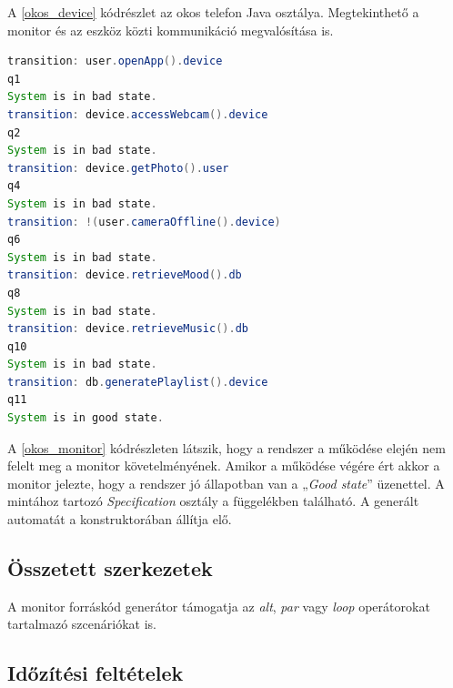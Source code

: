 A \ref{okos_device} kódrészlet az okos telefon Java osztálya.
Megtekinthető a monitor és az eszköz közti kommunikáció megvalósítása is.

\begin{lstlisting}[language=java, frame=single, float=ht!, caption={Monitor kimenete a rendszer működésének egyes fázisaiban.},captionpos=b,label=okos_monitor]
transition: user.openApp().device
q1
System is in bad state.
transition: device.accessWebcam().device
q2
System is in bad state.
transition: device.getPhoto().user
q4
System is in bad state.
transition: !(user.cameraOffline().device)
q6
System is in bad state.
transition: device.retrieveMood().db
q8
System is in bad state.
transition: device.retrieveMusic().db
q10
System is in bad state.
transition: db.generatePlaylist().device
q11
System is in good state.
\end{lstlisting}

A \ref{okos_monitor} kódrészleten látszik, hogy a rendszer a működése elején nem felelt meg a monitor követelményének.
Amikor a működése végére ért akkor a monitor jelezte, hogy a rendszer jó állapotban van a „\textit{Good state}” üzenettel.
A mintához tartozó \textit{Specification} osztály a függelékben található.
A generált automatát a konstruktorában állítja elő.

\clearpage\subsection{Összetett szerkezetek}

A monitor forráskód generátor támogatja az \textit{alt}, \textit{par} vagy \textit{loop} operátorokat tartalmazó szcenáriókat is.

\subsection{Időzítési feltételek}

